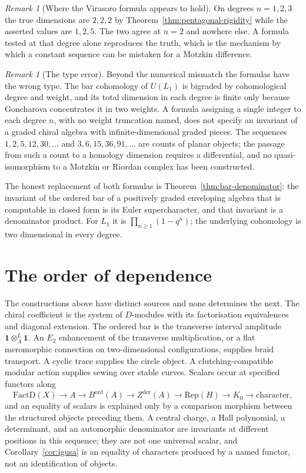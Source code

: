 \documentclass[11pt,reqno]{amsart}
\theoremstyle{definition}
\theoremstyle{remark}
\newtheorem{remark}[theorem]{Remark}
\providecommand{\FactD}{\mathrm{FactD}}
\providecommand{\unit}{\mathbf{1}}
\begin{document}
\begin{remark}[Where the Virasoro formula appears to hold]
\label{rem:n2-coincidence}
On degrees $n=1,2,3$ the true dimensions are $2,2,2$ by
Theorem~\ref{thm:pentagonal-rigidity} while the asserted values are
$1,2,5$. The two agree at $n=2$ and nowhere else. A formula tested at
that degree alone reproduces the truth, which is the mechanism by which a
constant sequence can be mistaken for a Motzkin difference.
\end{remark}

\begin{remark}[The type error]
\label{rem:type-error}
Beyond the numerical mismatch the formulas have the wrong type. The bar
cohomology of $U(L_1)$ is bigraded by cohomological degree and weight,
and its total dimension in each degree is finite only because Goncharova
concentrates it in two weights. A formula assigning a single integer to
each degree $n$, with no weight truncation named, does not specify an
invariant of a graded chiral algebra with infinite-dimensional graded
pieces. The sequences $1,2,5,12,30,\dots$ and $3,6,15,36,91,\dots$ are
counts of planar objects; the passage from such a count to a homology
dimension requires a differential, and no quasi-isomorphism to a Motzkin
or Riordan complex has been constructed.
\end{remark}

The honest replacement of both formulas is
Theorem~\ref{thm:bar-denominator}: the invariant of the ordered bar of a
positively graded enveloping algebra that is computable in closed form is
its Euler supercharacter, and that invariant is a denominator product.
For $L_1$ it is $\prod_{n\ge1}(1-q^n)$; the underlying cohomology is two
dimensional in every degree.

\section{The order of dependence}

The constructions above have distinct sources and none determines the
next. The chiral coefficient is the system of $D$-modules with its
factorisation equivalences and diagonal extension. The ordered bar is the
transverse interval amplitude $\unit\otimes^L_A\unit$. An $E_2$
enhancement of the transverse multiplication, or a flat meromorphic
connection on two-dimensional configurations, supplies braid transport. A
cyclic trace supplies the circle object. A clutching-compatible modular
action supplies sewing over stable curves. Scalars occur at specified
functors along
\[
  \FactD(X) \longrightarrow A \longrightarrow B^{\mathrm{ord}}(A)
  \longrightarrow Z^{\mathrm{der}}(A) \longrightarrow \mathrm{Rep}(H)
  \longrightarrow K_0 \longrightarrow \text{character},
\]
and an equality of scalars is explained only by a comparison morphism
between the structured objects preceding them. A central charge, a Hall
polynomial, a determinant, and an automorphic denominator are invariants
at different positions in this sequence; they are not one universal
scalar, and Corollary~\ref{cor:igusa} is an equality of characters
produced by a named functor, not an identification of objects.
\end{document}
